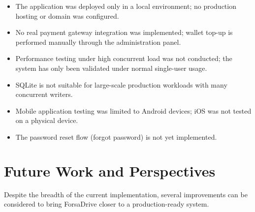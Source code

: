 \begin{itemize}[noitemsep]
    \item The application was deployed only in a local environment; no production hosting or domain was configured.
    \item No real payment gateway integration was implemented; wallet top-up is performed manually through the administration panel.
    \item Performance testing under high concurrent load was not conducted; the system has only been validated under normal single-user usage.
    \item SQLite is not suitable for large-scale production workloads with many concurrent writers.
    \item Mobile application testing was limited to Android devices; iOS was not tested on a physical device.
    \item The password reset flow (forgot password) is not yet implemented.
\end{itemize}

\section{Future Work and Perspectives}

Despite the breadth of the current implementation, several improvements can be considered to bring ForsaDrive closer to a production-ready system.

